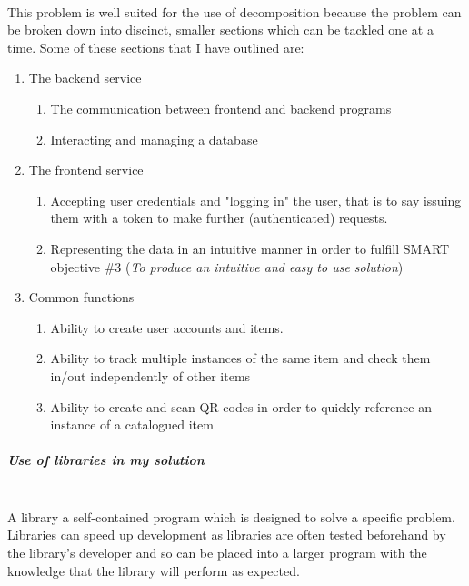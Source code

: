 \documentclass[../../../main.tex]{subfiles}
\begin{document}
\noindent \\ This problem is well suited for the use of decomposition because the problem can be
broken down into discinct, smaller sections which can be tackled one at a time. Some of these sections that I have outlined are:
\begin{enumerate}
    \item The backend service
          \begin{enumerate}
              \item The communication between frontend and backend programs
              \item Interacting and managing a database
          \end{enumerate}
    \item The frontend service
          \begin{enumerate}
              \item Accepting user credentials and "logging in" the user, that is to say
                    issuing them with a token to make further (authenticated) requests.
              \item Representing the data in an intuitive manner in order to fulfill SMART objective \#3 (\textit{To produce an intuitive and easy to use solution})
          \end{enumerate}

    \item Common functions
          \begin{enumerate}
              \item Ability to create user accounts and items.
              \item Ability to track multiple instances of the same item and check them in/out independently of other items
              \item Ability to create and scan QR codes in order to quickly reference an instance of a catalogued item
          \end{enumerate}
\end{enumerate}

\subparagraph{Use of libraries in my solution}

\noindent \\ A library a self-contained program which is designed to solve a specific problem.
Libraries can speed up development as libraries are often tested beforehand by the library's
developer and so can be placed into a larger program with the knowledge that the library will
perform as expected.
\end{document}
